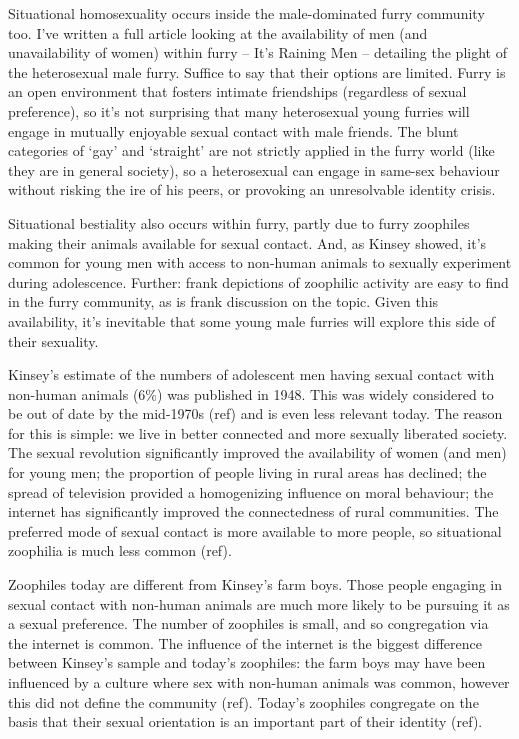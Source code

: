 Situational homosexuality occurs inside the male-dominated furry community too. I've written a full article looking at the availability of men (and unavailability of women) within furry -- It's Raining Men -- detailing the plight of the heterosexual male furry. Suffice to say that their options are limited. Furry is an open environment that fosters intimate friendships (regardless of sexual preference), so it's not surprising that many heterosexual young furries will engage in mutually enjoyable sexual contact with male friends. The blunt categories of `gay' and `straight' are not strictly applied in the furry world (like they are in general society), so a heterosexual can engage in same-sex behaviour without risking the ire of his peers, or provoking an unresolvable identity crisis.

Situational bestiality also occurs within furry, partly due to furry zoophiles making their animals available for sexual contact. And, as Kinsey showed, it's common for young men with access to non-human animals to sexually experiment during adolescence. Further: frank depictions of zoophilic activity are easy to find in the furry community, as is frank discussion on the topic. Given this availability, it's inevitable that some young male furries will explore this side of their sexuality.

Kinsey's estimate of the numbers of adolescent men having sexual contact with non-human animals (6\%) was published in 1948. This was widely considered to be out of date by the mid-1970s (ref) and is even less relevant today. The reason for this is simple: we live in better connected and more sexually liberated society. The sexual revolution significantly improved the availability of women (and men) for young men; the proportion of people living in rural areas has declined; the spread of television provided a homogenizing influence on moral behaviour; the internet has significantly improved the connectedness of rural communities. The preferred mode of sexual contact is more available to more people, so situational zoophilia is much less common (ref).

Zoophiles today are different from Kinsey's farm boys. Those people engaging in sexual contact with non-human animals are much more likely to be pursuing it as a sexual preference. The number of zoophiles is small, and so congregation via the internet is common. The influence of the internet is the biggest difference between Kinsey's sample and today's zoophiles: the farm boys may have been influenced by a culture where sex with non-human animals was common, however this did not define the community (ref). Today's zoophiles congregate on the basis that their sexual orientation is an important part of their identity (ref).

